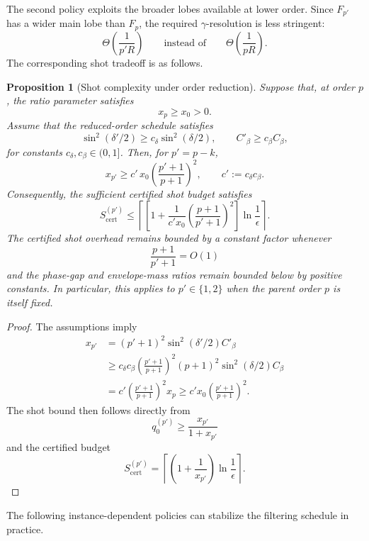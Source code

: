 \documentclass[a4paper,unpublished,onecolumn,11pt]{quantumarticle}
\newtheorem{proposition}[theorem]{Proposition}
\theoremstyle{definition}
\theoremstyle{remark}
\begin{document}
The second policy exploits the broader lobes available at lower order.
Since \(F_{p'}\) has a wider main lobe than \(F_p\), the required
\(\gamma\)-resolution is less stringent:
\[
\Theta\!\left(\frac{1}{p'R}\right)
\qquad\text{instead of}\qquad
\Theta\!\left(\frac{1}{pR}\right).
\]
The corresponding shot tradeoff is as follows.

\begin{proposition}[Shot complexity under order reduction]
\label{prop:shots-reduced}
Suppose that, at order \(p\), the ratio parameter satisfies
\[
x_p\ge x_0>0.
\]
Assume that the reduced-order schedule satisfies
\[
\sin^2(\delta'/2)
\ge
c_\delta\sin^2(\delta/2),
\qquad
C'_\beta
\ge
c_\beta C_\beta,
\]
for constants \(c_\delta,c_\beta\in(0,1]\). Then, for
\(p'=p-k\),
\[
x_{p'}
\ge
c'\,x_0
\left(
\frac{p'+1}{p+1}
\right)^2,
\qquad
c'
:=
c_\delta c_\beta.
\]
Consequently, the sufficient certified shot budget satisfies
\[
S_{\mathrm{cert}}^{(p')}
\le
\left\lceil
\left[
1+
\frac{1}{c'x_0}
\left(
\frac{p+1}{p'+1}
\right)^2
\right]
\ln\frac{1}{\epsilon}
\right\rceil.
\]
The certified shot overhead remains bounded by a constant factor
whenever
\[
\frac{p+1}{p'+1}
=
O(1)
\]
and the phase-gap and envelope-mass ratios remain bounded below by
positive constants. In particular, this applies to
\(p'\in\{1,2\}\) when the parent order \(p\) is itself fixed.
\end{proposition}

\begin{proof}
The assumptions imply
\[
\begin{aligned}
x_{p'}
&=
(p'+1)^2
\sin^2(\delta'/2)
C'_\beta
\\
&\ge
c_\delta c_\beta
\left(
\frac{p'+1}{p+1}
\right)^2
(p+1)^2
\sin^2(\delta/2)
C_\beta
\\
&=
c'
\left(
\frac{p'+1}{p+1}
\right)^2
x_p \ge
c'x_0
\left(
\frac{p'+1}{p+1}
\right)^2.
\end{aligned}
\]
The shot bound then follows directly from
\[
q_0^{(p')}
\ge
\frac{x_{p'}}{1+x_{p'}}
\]
and the certified budget
\[
S_{\mathrm{cert}}^{(p')}
=
\left\lceil
\left(
1+\frac{1}{x_{p'}}
\right)
\ln\frac{1}{\epsilon}
\right\rceil.
\]
\end{proof}

The following instance-dependent policies can stabilize the filtering
schedule in practice.
\end{document}
